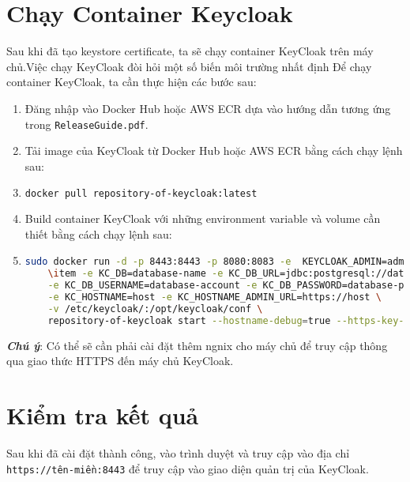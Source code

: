 \section{Chạy Container Keycloak}
Sau khi đã tạo keystore certificate, ta sẽ chạy container KeyCloak trên máy chủ.Việc chạy KeyCloak đòi hỏi một số biến môi trường nhất định  Để chạy container KeyCloak, ta cần thực hiện các bước sau:
\begin{enumerate}
    \item Đăng nhập vào Docker Hub hoặc AWS ECR dựa vào hướng dẫn tương ứng trong \texttt{ReleaseGuide.pdf}.
    \item Tải image của KeyCloak từ Docker Hub hoặc AWS ECR bằng cách chạy lệnh sau:
    \item \begin{lstlisting}[language=bash]
    docker pull repository-of-keycloak:latest
    \end{lstlisting}
    \item Build container KeyCloak với những environment variable và volume cần thiết bằng cách chạy lệnh sau:
    \item \begin{lstlisting}[language=bash]
    sudo docker run -d -p 8443:8443 -p 8080:8083 -e  KEYCLOAK_ADMIN=admin-account -e KEYCLOAK_ADMIN_PASSWORD=admin-password \
    \item -e KC_DB=database-name -e KC_DB_URL=jdbc:postgresql://database-host:port/database-name \
    -e KC_DB_USERNAME=database-account -e KC_DB_PASSWORD=database-password \
    -e KC_HOSTNAME=host -e KC_HOSTNAME_ADMIN_URL=https://host \
    -v /etc/keycloak/:/opt/keycloak/conf \
    repository-of-keycloak start --hostname-debug=true --https-key-store-file=/conf/keycloak.p12 --https-key-store-password=password-cert
    \end{lstlisting}
\end{enumerate}
\textbf{\textit{Chú ý}}: Có thể sẽ cần phải cài đặt thêm ngnix cho máy chủ để truy cập thông qua giao thức HTTPS đến máy chủ KeyCloak.

\section{Kiểm tra kết quả}
Sau khi đã cài đặt thành công, vào trình duyệt và truy cập vào địa chỉ \texttt{https://tên-miền:8443} để truy cập vào giao diện quản trị của KeyCloak.




